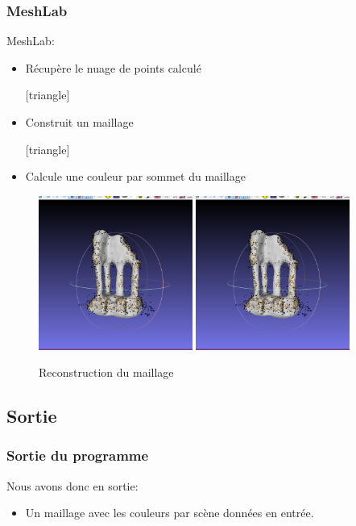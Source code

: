 	  \begin{frame}
	  \frametitle{MeshLab}
	    MeshLab:
	  \begin{itemize}
	    [triangle]
	    \item Récupère le nuage de points calculé
	    
	    [triangle]
	    \item Construit un maillage
	    
	    [triangle]
	    \item Calcule une couleur par sommet du maillage
	    \end{itemize}
	    
  \begin{figure}
  \includegraphics[width=0.45\textwidth]{Fig/nuagePtsTemple6coup.png}
  \includegraphics[width=0.45\textwidth]{Fig/nuagePtsTemple6coup.png}
  \caption{Reconstruction du maillage}
  \end{figure}
  
	 \end{frame}

	 \subsection{Sortie}
	 \begin{frame}
	  \frametitle{Sortie du programme}
	   Nous avons donc en sortie:
	  \begin{itemize}
	    [triangle]
	    \item Un maillage avec les couleurs par scène données en entrée.
	    
	    
	    \end{itemize}
	 \end{frame}

